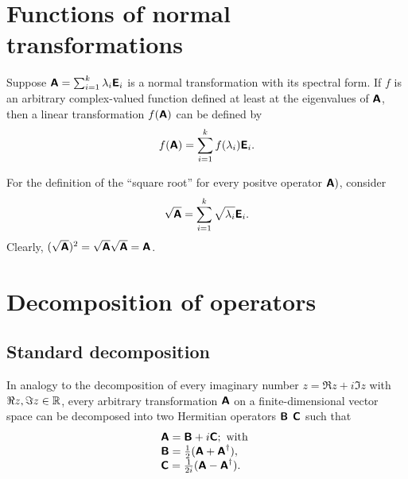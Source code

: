 \section{Functions of normal transformations}

Suppose $\textsf{\textbf{A}}=\sum_{i=1}^k \lambda_i  \textsf{\textbf{E}}_i $ is a normal transformation
with its spectral form.
If $f$ is an arbitrary complex-valued function defined at least at the eigenvalues of $\textsf{\textbf{A}}$,
then a linear transformation  $f(\textsf{\textbf{A}})$ can be defined by
\begin{equation}
f(\textsf{\textbf{A}})=\sum_{i=1}^k f(\lambda_i)  \textsf{\textbf{E}}_i.
\end{equation}

{
\color{blue}
\bexample
For the definition of the ``square root''
for every positve operator $\textsf{\textbf{A}})$, consider
\begin{equation}
\sqrt{\textsf{\textbf{A}}}=\sum_{i=1}^k \sqrt{\lambda_i}  \textsf{\textbf{E}}_i.
\end{equation}
Clearly, $(\sqrt{\textsf{\textbf{A}}})^2=\sqrt{\textsf{\textbf{A}}}\sqrt{\textsf{\textbf{A}}}= {\textsf{\textbf{A}}}$.
\eexample
}

\section{Decomposition of operators}

\subsection{Standard decomposition}

In analogy to the decomposition of every imaginary number $z= \Re z +i \Im z$ with $\Re z,\Im z\in {\Bbb R}$,
every arbitrary transformation $\textsf{\textbf{A}}$ on a finite-dimensional vector space can be decomposed into two Hermitian operators
$\textsf{\textbf{B}}$
$\textsf{\textbf{C}}$
such that
\begin{equation}
\begin{array}{l}
\textsf{\textbf{A}}=\textsf{\textbf{B}} + i \textsf{\textbf{C}}; \textrm{ with }  \\
\textsf{\textbf{B}}=\frac{1}{2}(\textsf{\textbf{A}} +   \textsf{\textbf{A}}^\dagger ), \\
\textsf{\textbf{C}}=\frac{1}{2i}(\textsf{\textbf{A}} -   \textsf{\textbf{A}}^\dagger ).
\end{array}
\end{equation}


